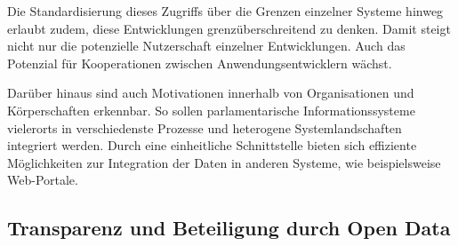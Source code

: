 \documentclass[,a4paper]{article}
\begin{document}
Die Standardisierung dieses Zugriffs über die Grenzen einzelner Systeme
hinweg erlaubt zudem, diese Entwicklungen grenzüberschreitend zu denken.
Damit steigt nicht nur die potenzielle Nutzerschaft einzelner
Entwicklungen. Auch das Potenzial für Kooperationen zwischen
Anwendungsentwicklern wächst.

Darüber hinaus sind auch Motivationen innerhalb von Organisationen und
Körperschaften erkennbar. So sollen parlamentarische Informationssysteme
vielerorts in verschiedenste Prozesse und heterogene Systemlandschaften
integriert werden. Durch eine einheitliche Schnittstelle bieten sich
effiziente Möglichkeiten zur Integration der Daten in anderen Systeme,
wie beispielsweise Web-Portale.

\subsection{Transparenz und Beteiligung durch Open
Data}\label{transparenz-und-beteiligung-durch-open-data}
\end{document}
